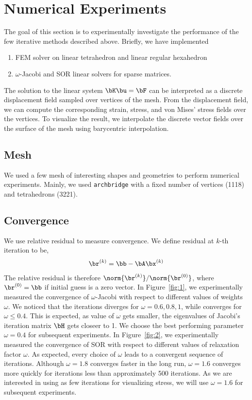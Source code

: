 \documentclass[11pt,titlepage]{article}
\begin{document}
\section{Numerical Experiments}

The goal of this section is to experimentally investigate the performance of the few iterative methods described above. Briefly, we have implemented 
\begin{enumerate}
    \item FEM solver on linear tetrahedron and linear regular hexahedron
    \item $\omega$-Jacobi and SOR linear solvers for sparse matrices. 
\end{enumerate}
The solution to the linear system $\bK \bu = \bF$ can be interpreted as a discrete displacement field sampled over vertices of the mesh. From the displacement field, we can compute the corresponding strain, stress, and von Mises' stress fields over the vertices. To visualize the result, we interpolate the discrete vector fields over the surface of the mesh using barycentric interpolation. 

\subsection{Mesh}

We used a few mesh of interesting shapes and geometries to perform numerical experiments. Mainly, we used \texttt{archbridge} with a fixed number of vertices (1118) and tetrahedrons (3221).


\subsection{Convergence}

We use relative residual to measure convergence. We define residual at $k$-th iteration to be,
\[
    \br^{(k)} = \bb - \bA \bx^{(k)}
\]
The relative residual is therefore $\norm{\br^{(k)}} / \norm{\br^{(0)}}$, where $\br^{(0)} = \bb$ if initial guess is a zero vector. In Figure~\ref{fig:1}, we experimentally measured the convergence of $\omega$-Jacobi with respect to different values of weights $\omega$. We noticed that the iterations diverges for $\omega=0.6,0.8,1$, while converges for $\omega\leq 0.4$. This is expected, as value of $\omega$ gets smaller, the eigenvalues of Jacobi's iteration matrix $\bH$ gets closeer to 1. We choose the best performing parameter $\omega=0.4$ for subsequent experiments. In Figure~\ref{fig:2}, we experimentally measured the convergence of SOR with respect to different values of relaxation factor $\omega$. As expected, every choice of $\omega$ leads to a convergent sequence of iterations. Although $\omega=1.8$ converges faster in the long run, $\omega=1.6$ converges more quickly for iterations less than approximately 500 iterations. As we are interested in using as few iterations for visualizing stress, we will use $\omega=1.6$ for subsequent experiments.
\end{document}
